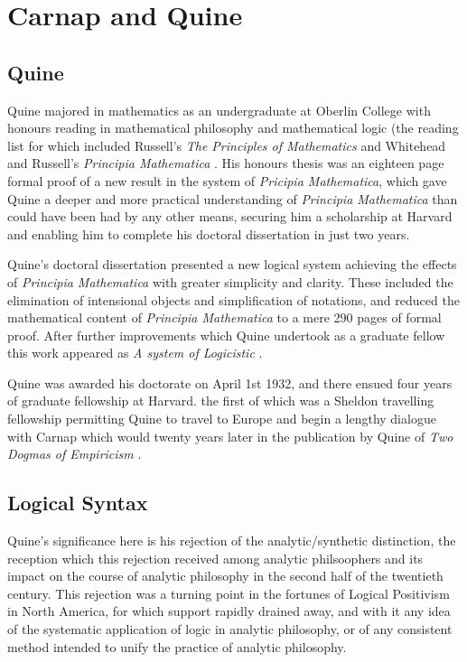\chapter{Carnap and Quine}

\section{Quine}


Quine majored in mathematics as an undergraduate at Oberlin College with honours reading in mathematical philosophy and mathematical logic (the reading list for which included Russell's \emph{The Principles of Mathematics} \cite{russell03} and Whitehead and Russell's \emph{Principia Mathematica} \cite{russell10}.
His honours thesis was an eighteen page formal proof of a new result in the system of \emph{Pricipia Mathematica}, which gave Quine a deeper and more practical understanding of \emph{Principia Mathematica} than could have been had by any other means, securing him a scholarship at Harvard and enabling him to complete his doctoral dissertation in just two years.

Quine's doctoral dissertation presented a new logical system achieving the effects of \emph{Principia Mathematica} with greater simplicity and clarity.
These included the elimination of intensional objects and simplification of notations, and reduced the mathematical content of \emph{Principia Mathematica} to a mere 290 pages of formal proof.
After further improvements which Quine undertook as a graduate fellow this work appeared as \emph{A system of Logicistic} \cite{quineASL}.

Quine was awarded his doctorate on April 1st 1932, and there ensued four years of graduate fellowship at Harvard. the first of which was a Sheldon travelling fellowship permitting Quine to travel to Europe and begin a lengthy dialogue with Carnap which would twenty years later in the publication by Quine of \emph{Two Dogmas of Empiricism} \cite{quine51}.


\section{Logical Syntax}



Quine's significance here is his rejection of the analytic/synthetic distinction, the reception which this rejection received among analytic philsoophers and its impact on the course of analytic philosophy in the second half of the twentieth century.
This rejection was a turning point in the fortunes of Logical Positivism in North America, for which support rapidly drained away, and with it any idea of the systematic application of logic in analytic philosophy, or of any consistent method intended to unify the practice of analytic philosophy.

